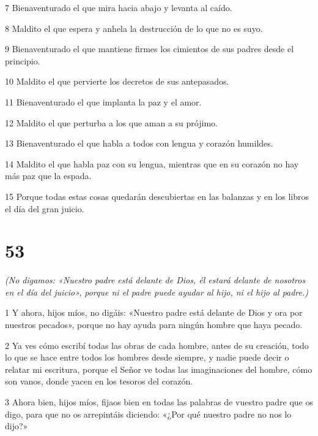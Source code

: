 \par 7 Bienaventurado el que mira hacia abajo y levanta al caído.

\par 8 Maldito el que espera y anhela la destrucción de lo que no es suyo.

\par 9 Bienaventurado el que mantiene firmes los cimientos de sus padres desde el principio.

\par 10 Maldito el que pervierte los decretos de sus antepasados.

\par 11 Bienaventurado el que implanta la paz y el amor.

\par 12 Maldito el que perturba a los que aman a su prójimo.

\par 13 Bienaventurado el que habla a todos con lengua y corazón humildes.

\par 14 Maldito el que habla paz con su lengua, mientras que en su corazón no hay más paz que la espada.

\par 15 Porque todas estas cosas quedarán descubiertas en las balanzas y en los libros el día del gran juicio.

\chapter{53}

\par \textit{(No digamos: «Nuestro padre está delante de Dios, él estará delante de nosotros en el día del juicio», porque ni el padre puede ayudar al hijo, ni el hijo al padre.)}

\par 1 Y ahora, hijos míos, no digáis: «Nuestro padre está delante de Dios y ora por nuestros pecados», porque no hay ayuda para ningún hombre que haya pecado.

\par 2 Ya ves cómo escribí todas las obras de cada hombre, antes de su creación, todo lo que se hace entre todos los hombres desde siempre, y nadie puede decir o relatar mi escritura, porque el Señor ve todas las imaginaciones del hombre, cómo son vanos, donde yacen en los tesoros del corazón.

\par 3 Ahora bien, hijos míos, fijaos bien en todas las palabras de vuestro padre que os digo, para que no os arrepintáis diciendo: «¿Por qué nuestro padre no nos lo dijo?»

